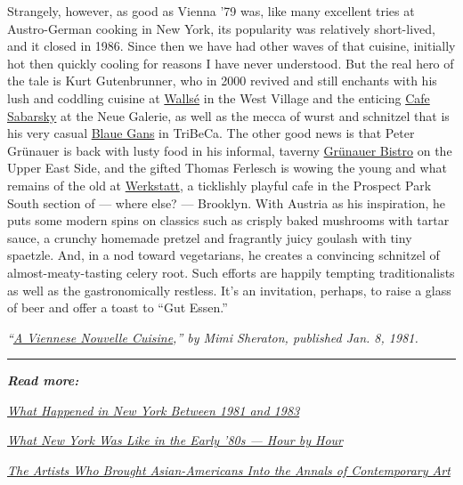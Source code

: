 Strangely, however, as good as Vienna '79 was, like many excellent tries
at Austro-German cooking in New York, its popularity was relatively
short-lived, and it closed in 1986. Since then we have had other waves
of that cuisine, initially hot then quickly cooling for reasons I have
never understood. But the real hero of the tale is Kurt Gutenbrunner,
who in 2000 revived and still enchants with his lush and coddling
cuisine at
\href{https://www.kurtgutenbrunner.com/restaurants/wallse/}{Wallsé} in
the West Village and the enticing
\href{http://www.neuegalerie.org/cafes/sabarsky}{Cafe Sabarsky} at the
Neue Galerie, as well as the mecca of wurst and schnitzel that is his
very casual
\href{https://www.kurtgutenbrunner.com/restaurants/blaue-gans/}{Blaue
Gans} in TriBeCa. The other good news is that Peter Grünauer is back
with lusty food in his informal, taverny
\href{http://grunauernyc.com/}{Grünauer Bistro} on the Upper East Side,
and the gifted Thomas Ferlesch is wowing the young and what remains of
the old at \href{http://www.werkstattbrooklyn.com/}{Werkstatt}, a
ticklishly playful cafe in the Prospect Park South section of --- where
else? --- Brooklyn. With Austria as his inspiration, he puts some modern
spins on classics such as crisply baked mushrooms with tartar sauce, a
crunchy homemade pretzel and fragrantly juicy goulash with tiny
spaetzle. And, in a nod toward vegetarians, he creates a convincing
schnitzel of almost-meaty-tasting celery root. Such efforts are happily
tempting traditionalists as well as the gastronomically restless. It's
an invitation, perhaps, to raise a glass of beer and offer a toast to
``Gut Essen.''

\emph{``\href{https://www.nytimes.com/1981/01/09/arts/restaurants-by-mimi-sheraton-a-viennese-nouvelle-cuisine.html}{A
Viennese Nouvelle Cuisine},'' by Mimi Sheraton, published Jan. 8, 1981.}

\begin{center}\rule{0.5\linewidth}{\linethickness}\end{center}

\emph{\textbf{Read more:}}

\emph{\href{https://www.nytimes.com/2018/04/17/t-magazine/timeline-1981-to-1983.html}{What
Happened in New York Between 1981 and 1983}}

\emph{\href{https://www.nytimes.com/2018/04/17/t-magazine/24-hours-new-york-city-1980s-life.html}{What
New York Was Like in the Early '80s --- Hour by Hour}}

\emph{\href{https://www.nytimes.com/2018/04/12/t-magazine/asian-american-art-martin-wong-tseng-kwong-chi.html}{The
Artists Who Brought Asian-Americans Into the Annals of Contemporary
Art}}

